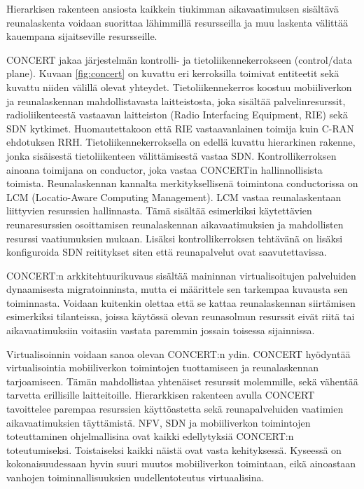 Hierarkisen rakenteen ansiosta kaikkein tiukimman aikavaatimuksen sisältävä reunalaskenta voidaan suorittaa lähimmillä resursseilla ja muu laskenta välittää kauempana sijaitseville resursseille.

CONCERT jakaa järjestelmän kontrolli- ja tietoliikennekerrokseen (control/data plane). 
Kuvaan \ref{fig:concert} on kuvattu eri kerroksilla toimivat entiteetit sekä kuvattu niiden välillä olevat yhteydet.
Tietoliikennekerros koostuu mobiiliverkon ja reunalaskennan mahdollistavasta laitteistosta, joka sisältää palvelinresurssit, radioliikenteestä vastaavan laitteiston (Radio Interfacing Equipment, RIE) sekä SDN kytkimet.
Huomautettakoon että RIE vastaavanlainen toimija kuin C-RAN ehdotuksen RRH.
Tietoliikennekerroksella on edellä kuvattu hierarkinen rakenne, jonka sisäisestä tietoliikenteen välittämisestä vastaa SDN.
Kontrollikerroksen ainoana toimijana on conductor, joka vastaa CONCERTin hallinnollisista toimista.
Reunalaskennan kannalta merkityksellisenä toimintona conductorissa on LCM (Locatio-Aware Computing Management).
LCM vastaa reunalaskentaan liittyvien resurssien hallinnasta. Tämä sisältää esimerkiksi käytettävien reunaresurssien osoittamisen reunalaskennan aikavaatimuksien ja mahdollisten resurssi vaatiumuksien mukaan.
Lisäksi kontrollikerroksen tehtävänä on lisäksi konfiguroida SDN reititykset siten että reunapalvelut ovat saavutettavissa.

CONCERT:n arkkitehtuurikuvaus sisältää maininnan virtualisoitujen palveluiden dynaamisesta migratoinninsta, mutta ei määrittele sen tarkempaa kuvausta sen toiminnasta. Voidaan kuitenkin olettaa että se kattaa reunalaskennan siirtämisen esimerkiksi tilanteissa, joissa käytössä olevan reunasolmun resurssit eivät riitä tai aikavaatimuksiin voitasiin vastata paremmin jossain toisessa sijainnissa.

Virtualisoinnin voidaan sanoa olevan CONCERT:n ydin. CONCERT hyödyntää virtualisointia mobiiliverkon toimintojen tuottamiseen ja reunalaskennan tarjoamiseen. Tämän mahdollistaa yhtenäiset resurssit molemmille, sekä vähentää tarvetta erillisille laitteitoille.
Hierarkkisen rakenteen avulla CONCERT tavoittelee parempaa resurssien käyttöastetta sekä  reunapalveluiden vaatimien aikavaatimuksien täyttämistä.
NFV, SDN ja mobiiliverkon toimintojen toteuttaminen ohjelmallisina ovat kaikki edellytyksiä CONCERT:n toteutumiseksi. Toistaiseksi kaikki näistä ovat vasta kehityksessä.
Kyseessä on kokonaisuudessaan hyvin suuri muutos mobiiliverkon toimintaan, eikä ainoastaan vanhojen toiminnallisuuksien uudellentoteutus virtuaalisina.
